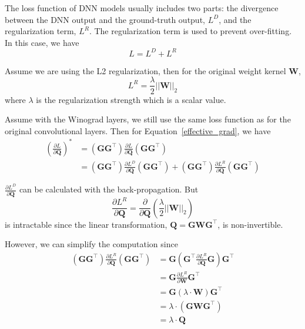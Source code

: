 \documentclass[12pt]{article} %
\begin{document}
The loss function of DNN models usually includes two parts: the divergence between the DNN output and the ground-truth output, $L^D$, and the regularization term, $L^R$. The regularization term is used to prevent over-fitting. In this case, we have
\begin{equation}
	L = L^D + L^R
\end{equation}

Assume we are using the L2 regularization, then for the original weight kernel $\boldsymbol{W}$,
\begin{equation}
	L^R = \frac{\lambda}{2}{||\boldsymbol{W}||}_2
\end{equation}
where $\lambda$ is the regularization strength which is a scalar value.

Assume with the Winograd layers, we still use the same loss function as for the original convolutional layers. Then for Equation~\ref{effective_grad}, we have
\begin{equation}
\label{effective_grad_2}
\begin{aligned}
	(\frac{\partial L}{\partial \boldsymbol{Q}})^*
		&= (\boldsymbol{G} \boldsymbol{G}^{\top})\frac{\partial L}{\partial \boldsymbol{Q}}(\boldsymbol{G} \boldsymbol{G}^{\top}) \\
		&= (\boldsymbol{G} \boldsymbol{G}^{\top})\frac{\partial L^D}{\partial \boldsymbol{Q}}(\boldsymbol{G} \boldsymbol{G}^{\top}) + 
		(\boldsymbol{G} \boldsymbol{G}^{\top})\frac{\partial L^R}{\partial \boldsymbol{Q}}(\boldsymbol{G} \boldsymbol{G}^{\top})
\end{aligned}
\end{equation}

$\frac{\partial L^D}{\partial \boldsymbol{Q}}$ can be calculated with the back-propagation. But
\begin{equation}
\frac{\partial L^R}{\partial \boldsymbol{Q}} = \frac{\partial}{\partial \boldsymbol{Q}}(\frac{\lambda}{2}{||\boldsymbol{W}||}_2)
\end{equation}
is intractable since the linear transformation, $\boldsymbol{Q} = \boldsymbol{G} \boldsymbol{W} \boldsymbol{G}^{\top}$, is non-invertible.

However, we can simplify the computation since
\begin{equation}
\begin{aligned}
	(\boldsymbol{G} \boldsymbol{G}^{\top})\frac{\partial L^R}{\partial \boldsymbol{Q}}(\boldsymbol{G} \boldsymbol{G}^{\top})
		&=\boldsymbol{G} (\boldsymbol{G}^{\top} \frac{\partial L^R}{\partial \boldsymbol{Q}} \boldsymbol{G}) \boldsymbol{G}^{\top} \\
		&= \boldsymbol{G} \frac{\partial L^R}{\partial \boldsymbol{W}} \boldsymbol{G}^{\top} \\
		&= \boldsymbol{G} (\lambda \cdot \boldsymbol{W}) \boldsymbol{G}^{\top} \\
		&= \lambda \cdot (\boldsymbol{G} \boldsymbol{W} \boldsymbol{G}^{\top}) \\
		&= \lambda \cdot \boldsymbol{Q}
\end{aligned}
\end{equation}
\end{document}
